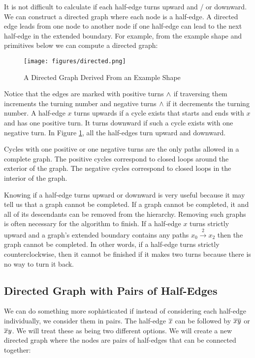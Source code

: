 \documentclass[acmtog]{acmart}
\begin{document}
It is not difficult to calculate if each half-edge turns upward and / or
downward. We can construct a directed graph where each node is a half-edge. A
directed edge leads from one node to another node if one half-edge can lead to
the next half-edge in the extended boundary. For example,
from the example shape and primitives below we can compute a directed graph:

\begin{figure}[H]
\centering
\texttt{[image: figures/directed.png]}
\caption{A Directed Graph Derived From an Example Shape}
\label{directSingle}
\end{figure}

Notice that the edges are marked with positive turns ${\wedge}$ if traversing them
increments the turning number and negative turns ${\wedge}$ if it decrements the
turning number. A half-edge $x$ turns upwards if a cycle exists that
starts and ends with $x$ and has one positive turn. It turns downward if
such a cycle exists with one negative turn. In Figure \ref{directSingle}, all
the half-edges turn upward and downward.

Cycles with one positive or one negative turns are the only paths allowed in 
a complete graph. The positive cycles correspond to closed loops around the
exterior of the graph. The negative cycles correspond to closed loops in the 
interior of the graph.

Knowing if a half-edge turns upward or downward is very useful because it may 
tell us that a graph cannot be completed. If a graph cannot be completed, it 
and all of its descendants can be removed from the hierarchy. Removing such 
graphs is often necessary for the algorithm to finish. If a half-edge $x$ 
turns strictly upward  and a graph's extended boundary contains any paths
$x_0 \xrightarrow{2} x_{2}$ then the graph cannot be completed. In other words, 
if a half-edge turns strictly counterclockwise, then it cannot be finished if it
makes two turns because there is no way to turn it back.

\subsection{Directed Graph with Pairs of Half-Edges}

We can do something more sophisticated if instead of considering each half-edge
individually, we consider them in pairs. The half-edge $\overline{x}$ can be followed
by $\overline{xy}$ or $\overline{x}y$. We will treat these as being two different options.
We will create a new directed graph where the nodes are pairs of half-edges that
can be connected together:
\end{document}
